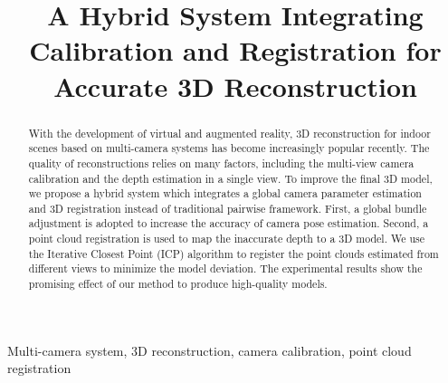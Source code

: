 \documentclass{article}
\begin{document}
\sloppy

\def\x{{\mathbf x}}
\def\L{{\cal L}}


\title{A Hybrid System Integrating Calibration and Registration for Accurate 3D Reconstruction}
%
\address{ }


\maketitle


%
\begin{abstract}
With the development of virtual and augmented reality, 3D reconstruction for indoor scenes based on multi-camera systems has become increasingly popular recently. 
%
The quality of reconstructions relies on many factors, including the multi-view camera calibration and the depth estimation in a single view. 
%
To improve the final 3D model, we propose a hybrid system which integrates a global camera parameter estimation and 3D registration instead of traditional pairwise framework.
%
First, a global bundle adjustment is adopted to increase the accuracy of camera pose estimation. 
Second, a point cloud registration is used to map the inaccurate depth to a 3D model. 
We use the Iterative Closest Point (ICP) algorithm to register the point clouds estimated from different views to minimize the model deviation. 
The experimental results show the promising effect of our method to produce high-quality models.
\end{abstract}
%
\begin{keywords}
Multi-camera system, 3D reconstruction, camera calibration, point cloud registration
\end{keywords}
%









\end{document}
